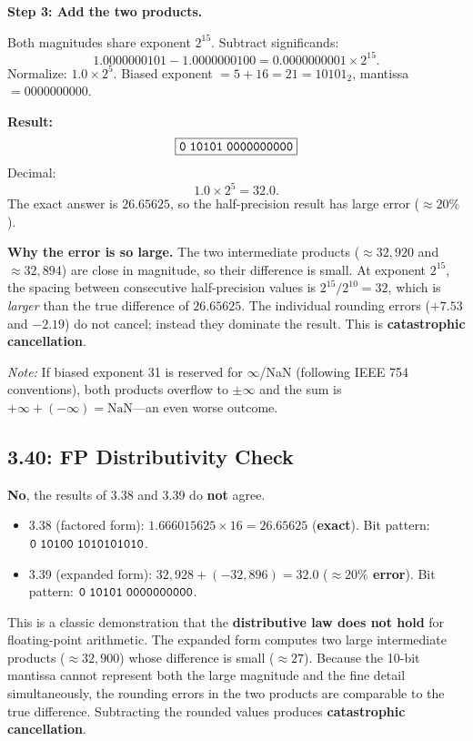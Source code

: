 \medskip\noindent\textbf{Step 3: Add the two products.}

Both magnitudes share exponent $2^{15}$.  Subtract significands:
\[
  1.0000000101 - 1.0000000100 = 0.0000000001 \times 2^{15}.
\]
Normalize: $1.0 \times 2^{5}$.
Biased exponent $= 5 + 16 = 21 = 10101_2$, mantissa $= 0000000000$.

\medskip\noindent\textbf{Result:}
\[
  \boxed{\texttt{0\;10101\;0000000000}}
\]
Decimal:
\[
  1.0 \times 2^5 = \mathbf{32.0}.
\]
The exact answer is $26.65625$, so the half-precision result has large error
($\approx 20\%$).

\medskip\noindent\textbf{Why the error is so large.}
The two intermediate products ($\approx 32{,}920$ and $\approx 32{,}894$)
are close in magnitude, so their difference is small.  At exponent $2^{15}$,
the spacing between consecutive half-precision values is
$2^{15}/2^{10} = 32$, which is \emph{larger} than the true difference of
$26.65625$.  The individual rounding errors ($+7.53$ and $-2.19$) do not cancel;
instead they dominate the result.  This is \textbf{catastrophic cancellation}.

\medskip\noindent\textit{Note:} If biased exponent 31 is reserved for
$\infty$/NaN (following IEEE 754 conventions), both products overflow to
$\pm\infty$ and the sum is $+\infty + (-\infty) = \text{NaN}$---an even worse
outcome.

\subsection*{3.40: FP Distributivity Check}
\hypertarget{sol-3.40}{}

\textbf{No}, the results of 3.38 and 3.39 do \textbf{not} agree.

\begin{itemize}
  \item 3.38 (factored form): $1.666015625 \times 16 = 26.65625$ (\textbf{exact}).
        Bit pattern: $\texttt{0\;10100\;1010101010}$.
  \item 3.39 (expanded form): $32{,}928 + (-32{,}896) = 32.0$
        (\textbf{$\approx 20\%$ error}).
        Bit pattern: $\texttt{0\;10101\;0000000000}$.
\end{itemize}

This is a classic demonstration that the \textbf{distributive law does not hold}
for floating-point arithmetic.  The expanded form computes two large
intermediate products ($\approx 32{,}900$) whose difference is small
($\approx 27$).  Because the 10-bit mantissa cannot represent both the large
magnitude and the fine detail simultaneously, the rounding errors in the two
products are comparable to the true difference.  Subtracting the rounded values
produces \textbf{catastrophic cancellation}.

